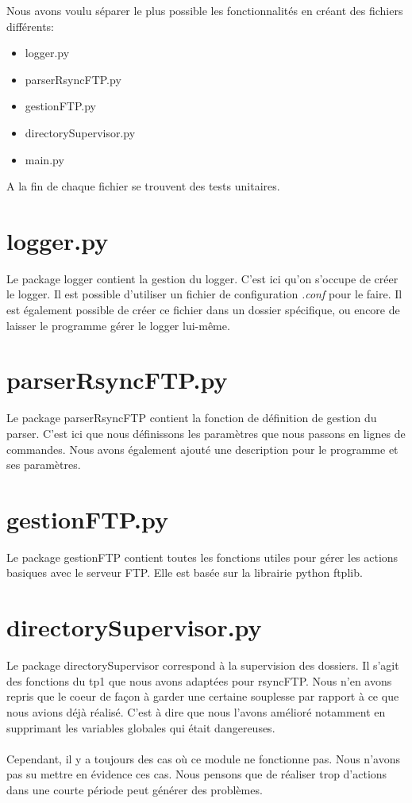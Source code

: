 Nous avons voulu séparer le plus possible les fonctionnalités en créant des fichiers différents: 
\begin{itemize}
\item logger.py
\item parserRsyncFTP.py
\item gestionFTP.py
\item directorySupervisor.py
\item main.py
\end{itemize}

A la fin de chaque fichier se trouvent des tests unitaires.

\section{logger.py}	

Le package logger contient la gestion du logger. C'est ici qu'on s'occupe de créer le logger.
Il est possible d'utiliser un fichier de configuration \textit{.conf} pour le faire. 
Il est également possible de créer ce fichier dans un dossier spécifique, 
ou encore de laisser le programme gérer le logger lui-même.

\section{parserRsyncFTP.py}

Le package parserRsyncFTP contient la fonction de définition de gestion du parser. 
C'est ici que nous définissons les paramètres que nous passons en lignes de commandes.
Nous avons également ajouté une description pour le programme et ses paramètres.

\section{gestionFTP.py}

Le package gestionFTP contient toutes les fonctions utiles pour gérer les actions basiques avec le serveur FTP.
Elle est basée sur la librairie python ftplib.

\section{directorySupervisor.py}

Le package directorySupervisor correspond à la supervision des dossiers. 
Il s'agit des fonctions du tp1 que nous avons adaptées pour rsyncFTP. 
Nous n'en avons repris que le coeur de façon à garder une certaine souplesse par rapport à ce que nous avions déjà réalisé.
C'est à dire que nous l'avons amélioré notamment en supprimant les variables globales qui était dangereuses.\\
\\
Cependant, il y a toujours des cas où ce module ne fonctionne pas. Nous n'avons pas su mettre en évidence ces cas.
Nous pensons que de réaliser trop d'actions dans une courte période peut générer des problèmes.

